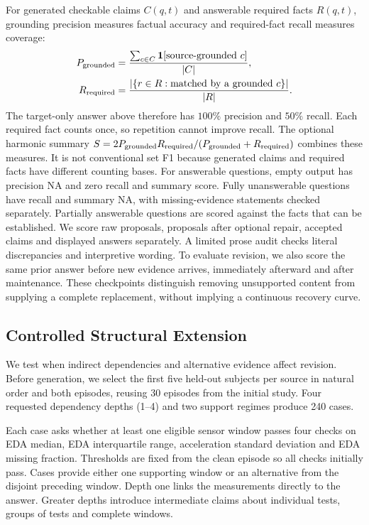 \documentclass[runningheads]{llncs}
\begin{document}
For generated checkable claims $C(q,t)$ and answerable required facts $R(q,t)$,
grounding precision measures factual accuracy and required-fact recall measures
coverage:
\begin{equation}
\begin{aligned}
 P_{\rm grounded}&=\frac{\sum_{c\in C}\mathbf 1[\text{source-grounded }c]}{|C|},\\
 R_{\rm required}&=\frac{|\{r\in R:\text{matched by a grounded }c\}|}{|R|}.
\end{aligned}
 \label{eq:semanticmetrics}
\end{equation}
The target-only answer above therefore has $100\%$ precision and $50\%$ recall.
Each required fact counts once, so repetition cannot improve recall.
The optional harmonic summary
$S=2P_{\rm grounded}R_{\rm required}/(P_{\rm grounded}+R_{\rm required})$
combines these measures. It is not conventional set F1 because generated
claims and required facts have different counting bases.
For answerable questions, empty output has precision NA and zero recall and
summary score. Fully unanswerable questions have recall and summary NA, with
missing-evidence statements checked separately. Partially answerable questions
are scored against the facts that can be established.
We score raw proposals, proposals after optional repair, accepted claims and
displayed answers separately. A limited prose audit checks literal discrepancies
and interpretive wording. To evaluate revision, we also score the same prior
answer before new evidence arrives, immediately afterward and after maintenance.
These checkpoints distinguish removing unsupported content from supplying a
complete replacement, without implying a continuous recovery curve.




\subsection{Controlled Structural Extension}

We test when indirect dependencies and alternative evidence affect revision.
Before generation, we select the first five held-out subjects per source in
natural order and both episodes, reusing 30 episodes from the initial study.
Four requested dependency depths (1--4) and two support regimes produce
240 cases.

Each case asks whether at least one eligible sensor window passes four checks
on EDA median, EDA interquartile range, acceleration standard deviation and
EDA missing fraction. Thresholds are fixed from the clean episode so all
checks initially pass. Cases provide either one supporting window or an
alternative from the disjoint preceding window. Depth one links the measurements
directly to the answer. Greater depths introduce intermediate claims about
individual tests, groups of tests and complete windows.
\end{document}
